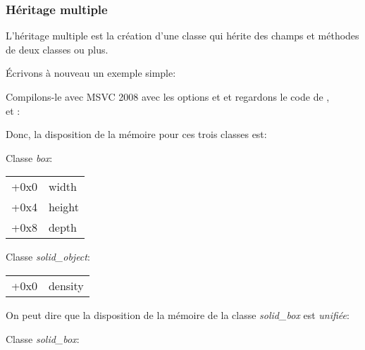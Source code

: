 \subsubsection{Héritage multiple}


L'héritage multiple est la création d'une classe qui hérite des champs et méthodes
de deux classes ou plus.

Écrivons à nouveau un exemple simple:




Compilons-le avec MSVC 2008 avec les options \Ox et \Obzero et regardons le code de ,\\
 et :








Donc, la disposition de la mémoire pour ces trois classes est:

Classe \emph{box}:

\begin{center}
\begin{tabular}{ | l | l | }
\hline
  \tableheader{} \\
\hline
  +0x0 & width \\
\hline
  +0x4 & height \\
\hline
  +0x8 & depth \\
\hline
\end{tabular}
\end{center}

Classe \emph{solid\_object}:

\begin{center}
\begin{tabular}{ | l | l | }
\hline
  \tableheader{} \\
\hline
  +0x0 & density \\
\hline
\end{tabular}
\end{center}


On peut dire que la disposition de la mémoire de la classe \emph{solid\_box} est \emph{unifiée}:

Classe \emph{solid\_box}:

